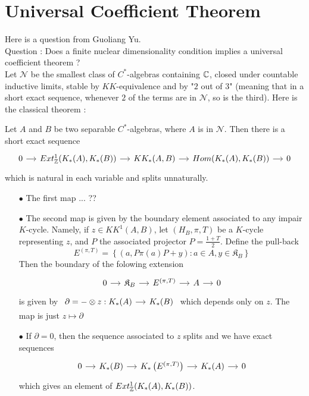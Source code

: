 \section{Universal Coefficient Theorem}

Here is a question from Guoliang Yu. \\

Question : Does a finite nuclear dimensionality condition implies a universal coefficient theorem ?\\

Let $\mathcal N$ be the smallest class of $C^*$-algebras containing $\mathbb C$, closed under countable inductive limits, stable by $KK$-equivalence and by "$2$ out of $3$" (meaning that in a short exact sequence, whenever $2$ of the terms are in $\mathcal N$, so is the third). Here is the classical theorem :

\begin{thm}
Let $A$ and $B$ be two separable $C^*$-algebras, where $A$ is in $\mathcal N$. Then there is a short exact sequence
\[\begin{tikzcd}[column sep = small]
0\arrow{r} & Ext_\Z^1(K_*(A),K_*(B)) \arrow{r} & KK_*(A,B)\arrow{r} & Hom(K_*(A),K_*(B)) \arrow{r} & 0 
\end{tikzcd}\]
which is natural in each variable and splits unnaturally.
\end{thm}

\begin{itemize}
\item[$\bullet$] The first map ... ??
\item[$\bullet$] The second map is given by the boundary element associated to any impair $K$-cycle. Namely, if $z\in KK^1(A,B)$, let $(H_B, \pi,T)$ be a $K$-cycle representing $z$, and $P$ the associated projector $P=\frac{1+T}{2}$. Define the pull-back
\[E^{(\pi,T)}=\left\{ (a,P\pi(a)P+y) : a\in A, y \in \mathfrak{K}_B \right\}\]
Then the boundary of the folowing extension
\[\begin{tikzcd}[column sep = small] 0\arrow{r} & \mathfrak{K}_B \arrow{r}  & E^{(\pi,T)}\arrow{r} & A \arrow{r} & 0 \end{tikzcd}\]
is given by $\begin{tikzcd}[column sep = small]\partial =-\otimes z : K_*(A)\arrow{r} & K_*(B)\end{tikzcd}$ which depends only on $z$. The map is just $z\mapsto \partial$\\
\item[$\bullet$] If $\partial =0$, then the sequence associated to $z$ splits and we have exact sequences
\[\begin{tikzcd}[column sep = small]
0\arrow{r} & K_*(B) \arrow{r} & K_*\left(E^{(\pi,T)}\right) \arrow{r} & K_*(A)\arrow{r} & 0
\end{tikzcd}\]
which gives an element of $Ext_\mathbb Z^1(K_*(A),K_*(B))$.
\end{itemize}

